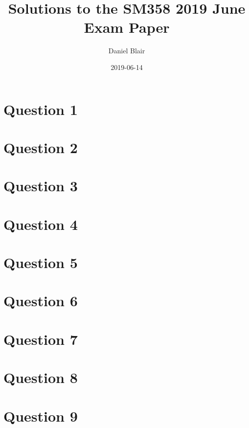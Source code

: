 \documentclass{article}
\title{Solutions to the SM358 2019 June Exam Paper}
\author{Daniel Blair}
\date{2019-06-14}
\begin{document}
\begin{titlingpage}
    \maketitle
\end{titlingpage}

\fancyhf{}


\section{Question 1}


\section{Question 2}


\section{Question 3}


\section{Question 4}


\section{Question 5}


\section{Question 6}


\section{Question 7}


\section{Question 8}


\section{Question 9}

\end{document}

